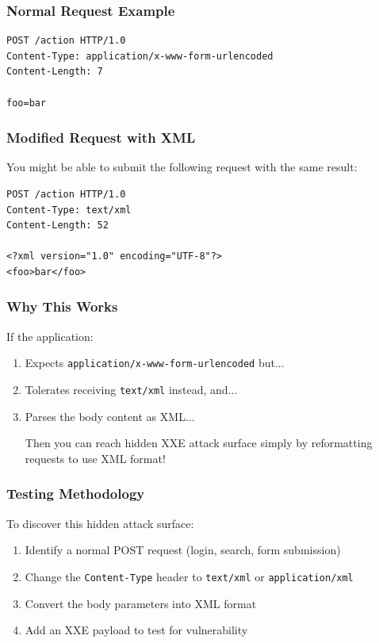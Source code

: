\documentclass{article}
\begin{document}
\subsubsection{Normal Request Example}
\begin{lstlisting}[caption=Standard Form Submission]
POST /action HTTP/1.0
Content-Type: application/x-www-form-urlencoded
Content-Length: 7

foo=bar
\end{lstlisting}

\subsubsection{Modified Request with XML}
You might be able to submit the following request with the same result:

\begin{lstlisting}[caption=Same Request in XML Format]
POST /action HTTP/1.0
Content-Type: text/xml
Content-Length: 52

<?xml version="1.0" encoding="UTF-8"?>
<foo>bar</foo>
\end{lstlisting}

\subsubsection{Why This Works}
\begin{codebox}
If the application:
\begin{enumerate}
    \item Expects \texttt{application/x-www-form-urlencoded} but...
    \item Tolerates receiving \texttt{text/xml} instead, and...
    \item Parses the body content as XML...
    
Then you can reach hidden XXE attack surface simply by reformatting requests to use XML format!
\end{enumerate}
\end{codebox}

\subsubsection{Testing Methodology}
To discover this hidden attack surface:

\begin{enumerate}
    \item Identify a normal POST request (login, search, form submission)
    \item Change the \texttt{Content-Type} header to \texttt{text/xml} or \texttt{application/xml}
    \item Convert the body parameters into XML format
    \item Add an XXE payload to test for vulnerability
\end{enumerate}
\end{document}
